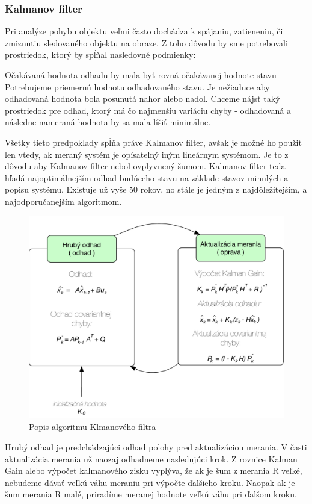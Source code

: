 \subsubsection{Kalmanov filter}
Pri analýze pohybu objektu veľmi často dochádza k spájaniu, zatieneniu, či zmiznutiu sledovaného  objektu na obraze. Z toho dôvodu by sme potrebovali prostriedok, ktorý by spĺňal nasledovné podmienky: 


Očakávaná hodnota odhadu by mala byť rovná očakávanej hodnote stavu - Potrebujeme priemernú hodnotu odhadovaného stavu. Je nežiaduce aby odhadovaná hodnota bola posunutá nahor alebo nadol. 
Chceme nájsť taký prostriedok pre odhad, ktorý má čo najmenšiu variáciu chyby - odhadovaná a následne nameraná hodnota by sa mala líšiť minimálne. 



Všetky tieto predpoklady spĺňa práve Kalmanov filter, avšak je možné ho použiť len vtedy, ak  meraný systém je opísateľný iným lineárnym systémom. Je to z dôvodu aby Kalmanov filter nebol ovplyvnený šumom. Kalmanov filter teda hľadá najoptimálnejším odhad budúceho stavu na základe stavov minulých a popisu systému.  Existuje už vyše 50 rokov, no stále je jedným z najdôležitejším, a najodporučanejším algoritmom.

\begin{figure}[H]
\begin{center}
	\includegraphics[scale=0.6]{obrazky/kalman}
	\caption{Popis algoritmu Klmanového filtra}
	\end{center}
\end{figure}

Hrubý odhad je predchádzajúci odhad polohy pred aktualizáciou merania. V časti aktualizácia merania už naozaj odhadneme nasledujúci krok. Z rovnice Kalman Gain alebo výpočet kalmanového zisku vyplýva, že ak je šum z merania R veľké, nebudeme dávať veľkú váhu meraniu pri výpočte ďalšieho kroku. Naopak ak je šum merania R malé, priradíme meranej hodnote veľkú váhu pri ďalšom kroku.  